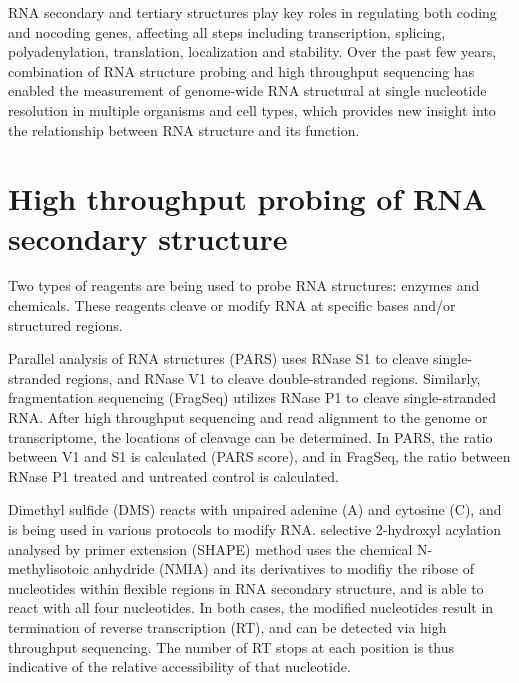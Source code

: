 \documentclass{proposal}
\begin{document}
RNA secondary and tertiary structures play key roles in regulating both coding and nocoding genes,
affecting all steps including transcription, splicing, polyadenylation, translation,
localization and stability\cite{wan2011understanding, mortimer2014insights, bevilacqua2016genome}.
Over the past few years, combination of RNA structure probing and high throughput sequencing has enabled
the measurement of genome-wide RNA structural at single nucleotide resolution in multiple organisms and cell types,
which provides new insight into the relationship between RNA structure and its function.



\section{High throughput probing of RNA secondary structure}

Two types of reagents are being used to probe RNA structures: enzymes and chemicals.
These reagents cleave or modify RNA at specific bases and/or structured regions.

﻿Parallel analysis of RNA structures (PARS)\cite{wan2014landscape}
﻿uses RNase S1 to cleave single-stranded regions, and RNase V1 to cleave double-stranded regions.
Similarly, ﻿fragmentation sequencing (FragSeq)\cite{underwood2010fragseq} utilizes ﻿RNase P1 to cleave single-stranded RNA.
After high throughput sequencing and read alignment to the genome or transcriptome,
the locations of cleavage can be determined.
In PARS, the ratio between V1 and S1 is calculated (PARS score),
and in FragSeq, the ratio between ﻿RNase P1 treated and untreated control is calculated.


﻿Dimethyl sulfide (DMS) reacts with ﻿unpaired adenine (A) and cytosine (C),
and is being used in various protocols to modify RNA\cite{rouskin2014genome, talkish2014mod}.
﻿selective 2-hydroxyl acylation analysed by primer extension (SHAPE)
method uses the chemical N-methylisotoic anhydride (NMIA) and its derivatives to
modifiy the ribose of nucleotides within flexible regions in RNA secondary structure,
and is able to react with all four nucleotides.
In both cases, the modified nucleotides result in ﻿termination of reverse transcription (RT),
and can be detected via high throughput sequencing.
The number of RT stops at each position is thus indicative of the relative accessibility of that nucleotide.
\end{document}
